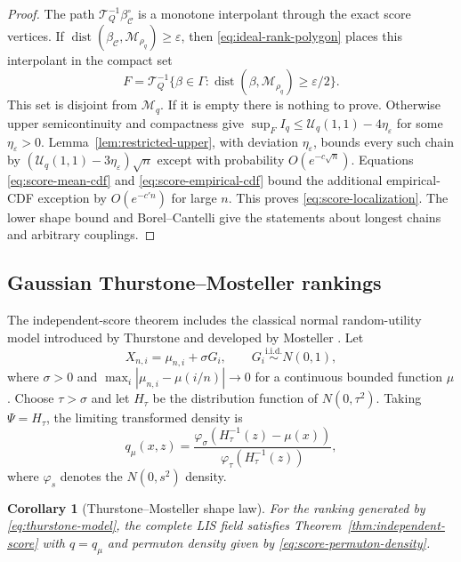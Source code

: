 \documentclass[11pt]{article}
\newtheorem{corollary}[theorem]{Corollary}
\theoremstyle{remark}
\newcommand{\eps}{\varepsilon}
\newcommand{\calU}{\mathcal U}
\newcommand{\dist}{\operatorname{dist}}
\begin{document}
\begin{proof}
The path $\mathcal T_Q^{-1}\beta^\circ_{\mathcal C}$ is a monotone
interpolant through the exact score vertices.  If
$\dist(\beta_{\mathcal C},\mathscr M_{\rho_q})\ge\eps$, then
\eqref{eq:ideal-rank-polygon} places this interpolant in the compact set
\[
 F=\mathcal T_Q^{-1}
   \{\beta\in\Gamma:
          \dist(\beta,\mathscr M_{\rho_q})\ge\eps/2\}.
\]
This set is disjoint from $\mathscr M_q$.  If it is empty there is nothing
to prove.  Otherwise upper semicontinuity and compactness give
$\sup_F I_q\le\calU_q(1,1)-4\eta_\eps$ for some $\eta_\eps>0$.
Lemma~\ref{lem:restricted-upper}, with deviation $\eta_\eps$, bounds every
such chain by $(\calU_q(1,1)-3\eta_\eps)\sqrt n$ except with probability
$O(e^{-c\sqrt n})$.  Equations \eqref{eq:score-mean-cdf} and
\eqref{eq:score-empirical-cdf} bound the additional empirical-CDF exception
by $O(e^{-c'n})$ for large $n$.  This proves
\eqref{eq:score-localization}.  The lower shape bound and Borel--Cantelli
give the statements about longest chains and arbitrary couplings.
\end{proof}

\subsection{Gaussian Thurstone--Mosteller rankings}

The independent-score theorem includes the classical normal random-utility
model introduced by Thurstone and developed by Mosteller
\cite{Thurstone1927,Mosteller1951}.  Let
\begin{equation}\label{eq:thurstone-model}
        X_{n,i}=\mu_{n,i}+\sigma G_i,
        \qquad G_i\stackrel{\mathrm{i.i.d.}}\sim N(0,1),
\end{equation}
where $\sigma>0$ and
$\max_i|\mu_{n,i}-\mu(i/n)|\to0$ for a continuous bounded function $\mu$.
Choose $\tau>\sigma$ and let $H_\tau$ be the distribution function of
$N(0,\tau^2)$.  Taking $\Psi=H_\tau$, the limiting transformed density is
\begin{equation}\label{eq:thurstone-q}
 q_\mu(x,z)
 =\frac{\varphi_\sigma(H_\tau^{-1}(z)-\mu(x))}
        {\varphi_\tau(H_\tau^{-1}(z))},
\end{equation}
where $\varphi_s$ denotes the $N(0,s^2)$ density.

\begin{corollary}[Thurstone--Mosteller shape law]
\label{cor:thurstone}
For the ranking generated by \eqref{eq:thurstone-model}, the complete LIS
field satisfies Theorem~\ref{thm:independent-score} with $q=q_\mu$ and
permuton density given by \eqref{eq:score-permuton-density}.
\end{corollary}
\end{document}
